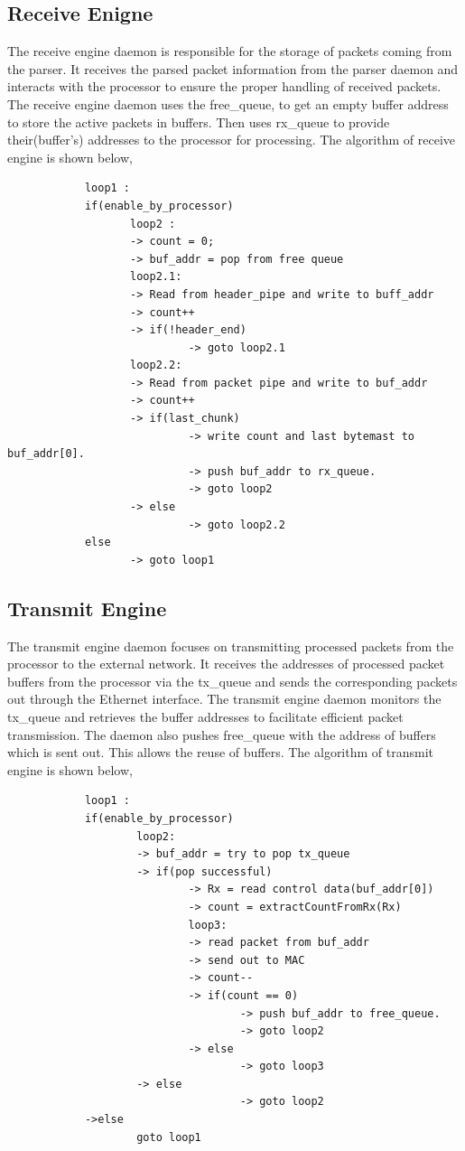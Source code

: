 \documentclass[12pt]{report}
\begin{document}
		\subsection{Receive Enigne}
				The receive engine daemon is responsible for the storage of packets coming from the parser. It receives the parsed packet information from the parser daemon and interacts with the processor to ensure the proper handling of received packets. The receive engine daemon uses the free\_queue, to get an empty buffer address to store the active packets in buffers.
			Then uses rx\_queue to provide their(buffer's) addresses to the processor for processing. The algorithm of receive engine is shown below,
		\begin{verbatim}
			loop1 :
			if(enable_by_processor)
			       loop2 :
			       -> count = 0;
			       -> buf_addr = pop from free queue
			       loop2.1:
			       -> Read from header_pipe and write to buff_addr
			       -> count++
			       -> if(!header_end)
			       	        -> goto loop2.1
			       loop2.2:
			       -> Read from packet pipe and write to buf_addr 
			       -> count++
			       -> if(last_chunk)
			       	        -> write count and last bytemast to buf_addr[0].
			       	        -> push buf_addr to rx_queue.
			                -> goto loop2
			       -> else
			       	        -> goto loop2.2
			else
			       -> goto loop1
		\end{verbatim}

		\subsection{Transmit Engine}
				The transmit engine daemon focuses on transmitting processed packets from the processor to the external network. It receives the addresses of processed packet buffers from the processor via the tx\_queue and sends the corresponding packets out through the Ethernet interface. The transmit engine daemon monitors the tx\_queue and retrieves the buffer addresses to facilitate efficient packet transmission. The daemon also pushes free\_queue with the address of buffers which is sent out. This allows the reuse of buffers. The algorithm of transmit engine is shown below,
		\begin{verbatim}
			loop1 : 
			if(enable_by_processor)
			        loop2:
			        -> buf_addr = try to pop tx_queue
			        -> if(pop successful)
			                -> Rx = read control data(buf_addr[0]) 
			                -> count = extractCountFromRx(Rx)
			                loop3:
			                -> read packet from buf_addr
			                -> send out to MAC
			                -> count--
			                -> if(count == 0)
			                        -> push buf_addr to free_queue.
			                        -> goto loop2 
			                -> else
			                        -> goto loop3
			        -> else
			                        -> goto loop2
			->else
			        goto loop1
		\end{verbatim}
\end{document}

